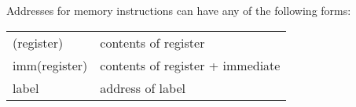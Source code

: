 \documentclass{article}
\begin{document}
Addresses for memory instructions can have any of the following forms:
\begin{center}
\begin{tabular}{ll}
(register) & contents of register \\
imm(register) & contents of register + immediate \\
label & address of label
\end{tabular}
\end{center}


\end{document}
